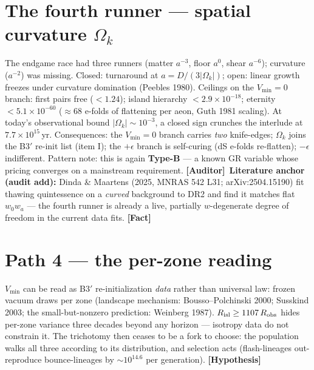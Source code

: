 \documentclass[11pt]{article}
\newcommand{\Fact}{\textbf{\textcolor{green!45!black}{[Fact]}}}
\newcommand{\Auditor}{\textbf{\textcolor{teal!55!black}{[Auditor]}}}
\newcommand{\hyp}{\textcolor{orange!80!black}{\textbf{[Hypothesis]}}}
\begin{document}
\section{The fourth runner --- spatial curvature $\Omega_k$}
The endgame race had three runners (matter $a^{-3}$, floor $a^{0}$, shear $a^{-6}$); curvature ($a^{-2}$) was missing. Closed: turnaround at $a=D/(3|\Omega_k|)$; open: linear growth freezes under curvature domination (Peebles 1980). Ceilings on the $V_{\min}=0$ branch: first pairs free ($<1.24$); island hierarchy $<2.9\times10^{-18}$; eternity $<5.1\times10^{-60}$ ($\approx$68 e-folds of flattening per aeon, Guth 1981 scaling). At today's observational bound $|\Omega_k|\sim10^{-3}$, a closed sign crunches the interlude at $7.7\times10^{15}$\,yr. Consequences: the $V_{\min}=0$ branch carries \emph{two} knife-edges; $\Omega_k$ joins the B3$'$ re-init list (item I); the $+\epsilon$ branch is self-curing (dS e-folds re-flatten); $-\epsilon$ indifferent. Pattern note: this is again \textbf{Type-B} --- a known GR variable whose pricing converges on a mainstream requirement. \Auditor\ \textbf{Literature anchor (audit add):} Dinda \& Maartens (2025, MNRAS 542 L31; arXiv:2504.15190) fit thawing quintessence on a \emph{curved} background to DR2 and find it matches flat $w_0w_a$ --- the fourth runner is already a live, partially $w$-degenerate degree of freedom in the current data fits. \Fact

\section{Path 4 --- the per-zone reading}
$V_{\min}$ can be read as B3$'$ re-initialization \emph{data} rather than universal law: frozen vacuum draws per zone (landscape mechanism: Bousso--Polchinski 2000; Susskind 2003; the small-but-nonzero prediction: Weinberg 1987). $R_{\rm isl}\ge1107\,R_{\rm obs}$ hides per-zone variance three decades beyond any horizon --- isotropy data do not constrain it. The trichotomy then ceases to be a fork to choose: the population walks all three according to its distribution, and selection acts (flash-lineages out-reproduce bounce-lineages by $\sim10^{14.6}$ per generation). \hyp
\end{document}
